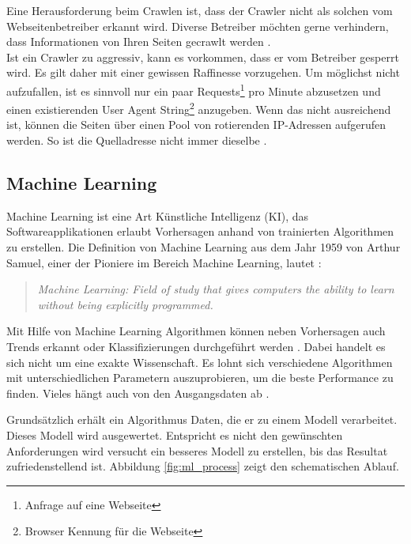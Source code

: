 %
Eine Herausforderung beim Crawlen ist, dass der Crawler nicht als solchen vom Webseitenbetreiber erkannt wird. Diverse Betreiber möchten gerne verhindern, dass Informationen von Ihren Seiten gecrawlt werden \cite{comparis}.\\
Ist ein Crawler zu aggressiv, kann es vorkommen, dass er vom Betreiber gesperrt wird. Es gilt daher mit einer gewissen Raffinesse vorzugehen. Um möglichst nicht aufzufallen, ist es sinnvoll nur ein paar Requests\footnote{Anfrage auf eine Webseite} pro Minute abzusetzen und einen existierenden User Agent String\footnote{Browser Kennung für die Webseite} anzugeben. Wenn das nicht ausreichend ist, können die Seiten über einen Pool von rotierenden IP-Adressen aufgerufen werden. So ist die Quelladresse nicht immer dieselbe \cite{offensive_crawling}.
%
\subsection{Machine Learning}
Machine Learning ist eine Art Künstliche Intelligenz (KI), das Softwareapplikationen erlaubt Vorhersagen anhand von trainierten Algorithmen zu erstellen.
Die Definition von Machine Learning aus dem Jahr 1959 von Arthur Samuel, einer der Pioniere im Bereich Machine Learning, lautet \cite{what_is_ml}:
  \begin{quote}
  \textit{Machine Learning: Field of study that gives computers the ability to learn without being explicitly programmed.}
  \end{quote}
Mit Hilfe von Machine Learning Algorithmen können neben Vorhersagen auch Trends erkannt oder Klassifizierungen durchgeführt werden \cite{ml_book}.
Dabei handelt es sich nicht um eine exakte Wissenschaft. Es lohnt sich verschiedene Algorithmen mit unterschiedlichen Parametern auszuprobieren, um die beste Performance zu finden. Vieles hängt auch von den Ausgangsdaten ab \cite{ml_azure}.

Grundsätzlich erhält ein Algorithmus Daten, die er zu einem Modell verarbeitet. Dieses Modell wird ausgewertet. Entspricht es nicht den gewünschten Anforderungen wird versucht ein besseres Modell zu erstellen, bis das Resultat zufriedenstellend ist. Abbildung \ref{fig:ml_process} zeigt den schematischen Ablauf.\\


